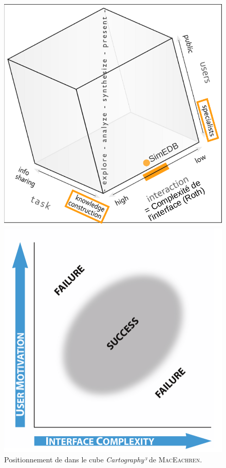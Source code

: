 \begin{figure}[H]
	\hspace*{\fill}%
	\begin{minipage}[t]{.46\linewidth}
		\centering
		\captionsetup{width=.9\linewidth}
		\vspace{0pt}
		\includegraphics[width=\linewidth]{img/Cartography3_SimEDB.pdf}
		\caption{Positionnement de \simedb{} dans le cube \textit{Cartography³} de \textsc{MacEachren}.}
		\label{fig:cartography3-simedb}
	\end{minipage} \hfill
	\begin{minipage}[t]{.46\linewidth}
		\centering
		\captionsetup{width=.9\linewidth}
		\vspace{0pt}
		\includegraphics[width=\linewidth]{img/Roth_Interface_Complexity.png}

\end{minipage}
\end{figure}
